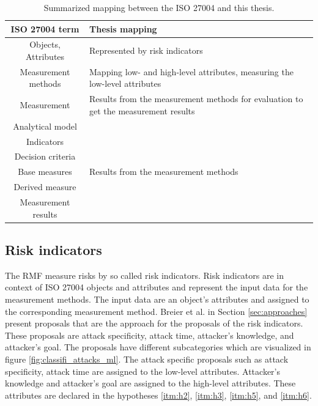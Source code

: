 \begin{table}[h!]
\centering
  \begin{tabular}{| c | p{10cm} |}
  \hline
  \rowcolor{lightgray} ISO 27004 term & Thesis mapping \\ [0.5ex]
  \hline
  Objects, Attributes & Represented by risk indicators \\
  \hline
  Measurement methods & Mapping low- and high-level attributes, measuring the low-level attributes \\
  \hline
  Measurement & Results from the measurement methods for evaluation to get the measurement results \\
  \hline
  Analytical model & \\
  \hline
  Indicators & \\
  \hline
  Decision criteria & \\
  \hline
  Base measures & Results from the measurement methods \\
  \hline
  Derived measure & \\
  \hline
  Measurement results & \\
  \hline
  \end{tabular}
\caption{Summarized mapping between the ISO 27004 and this thesis.}
\label{tab:iso_table}
\end{table}

\subsection{Risk indicators}
\label{sec:risk_indicators}

The RMF measure risks by so called risk indicators. Risk indicators are in context of ISO 27004 \cite{ISO_27004_2009} objects and attributes and represent the input data for the measurement methods. The input data are an object's attributes and assigned to the corresponding measurement method. Breier et al. \cite{DBLP:journals/corr/abs-2012-04884} in Section \ref{sec:approaches} present
proposals that are the approach for the proposals of the risk indicators. These proposals are attack specificity, attack time, attacker's knowledge, and attacker's goal. The proposals have different subcategories which are visualized in figure \ref{fig:classifi_attacks_ml}. The attack specific proposals such as attack specificity, attack time are assigned to the low-level attributes. Attacker's knowledge and attacker's goal are assigned to the high-level attributes. These attributes are declared in the hypotheses \ref{itm:h2}, \ref{itm:h3}, \ref{itm:h5}, and \ref{itm:h6}.

